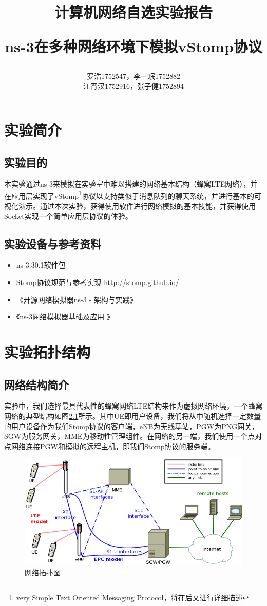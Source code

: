 \documentclass{ctexrep}
\title{\textbf{计算机网络自选实验报告} \\ [2ex] \begin{large} ns-3在多种网络环境下模拟vStomp协议 \end{large} }
\author{罗浩1752547，李一珉1752882\\江宵汉1752916，张子健1752894}
\date{}
\begin{document}
	\maketitle
	\tableofcontents
	
	\chapter{实验简介}
	\section{实验目的}
	本实验通过ns-3来模拟在实验室中难以搭建的网络基本结构（蜂窝LTE网络），并在应用层实现了vStomp\footnote{very Simple Text Oriented Messaging Protocol，将在后文进行详细描述}协议以支持类似于消息队列的聊天系统，并进行基本的可视化演示。通过本次实验，获得使用软件进行网络模拟的基本技能，并获得使用Socket实现一个简单应用层协议的体验。
	\section{实验设备与参考资料}
	\begin{itemize}
		\item ns-3.30.1软件包
		\item Stomp协议规范与参考实现 \url{http://stomp.github.io/}
		\item 《开源网络模拟器ns-3 - 架构与实践》
		\item 《ns-3网络模拟器基础及应用 》
	\end{itemize}
	\chapter{实验拓扑结构}
	\section{网络结构简介}
	实验中，我们选择最具代表性的蜂窝网络LTE结构来作为虚拟网络环境，一个蜂窝网络的典型结构如图\ref{fig:topology}所示。其中UE即用户设备，我们将从中随机选择一定数量的用户设备作为我们Stomp协议的客户端，eNB为无线基站，PGW为PNG网关，SGW为服务网关，MME为移动性管理组件。在网络的另一端，我们使用一个点对点网络连接PGW和模拟的远程主机，即我们Stomp协议的服务端。
	\begin{figure}[H]
		\centering
		\includegraphics[width=0.9\linewidth]{img/topology}
		\caption{网络拓扑图}
		\label{fig:topology}
	\end{figure}
	
\end{document}
